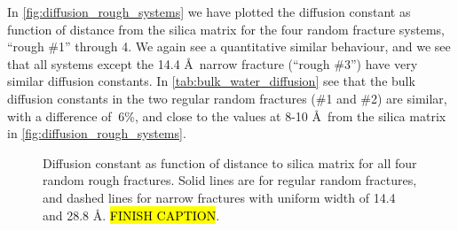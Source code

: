 In \cref{fig:diffusion_rough_systems} we have plotted the diffusion constant as function of distance from the silica matrix for the four random fracture systems, ``rough \#1'' through 4. We again see a quantitative similar behaviour, and we see that all systems except the 14.4 \AA\ narrow fracture (``rough \#3'') have very similar diffusion constants. In \cref{tab:bulk_water_diffusion} see that the bulk diffusion constants in the two regular random fractures (\#1 and \#2) are similar, with a difference of $~6$\%, and close to the values at 8-10 \AA\ from the silica matrix in \cref{fig:diffusion_rough_systems}.
%
%
%
\begin{figure}[htpb]%
    \begin{minipage}[t]{0.499\textwidth}%
        \captionsetup{width=0.925\textwidth}%
        \centering%
        \caption{%
            Diffusion constant as function of distance to silica matrix for all four reference systems (flat pores). The solid lines are for the two systems with 86 \AA\ wide pores, and the dashed lines for narrow fractures of 14.4 and 28.8 \AA. \hl{FINISH CAPTION}. %
        }%
    \end{minipage}%
    \hfill%
    \begin{minipage}[t]{0.499\textwidth}%
        \captionsetup{width=0.925\textwidth}%
        \centering%
        \caption{%
            Diffusion constant as function of distance to silica matrix for all four random rough fractures. Solid lines are for regular random fractures, and dashed lines for narrow fractures with uniform width of 14.4 and 28.8 \AA. \hl{FINISH CAPTION}. %
        }%
    \end{minipage}%
\end{figure}%

